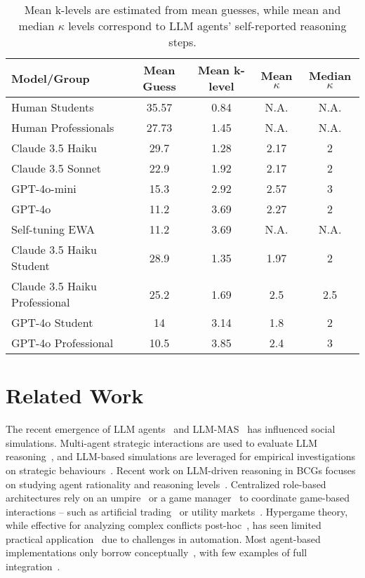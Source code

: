 \documentclass[runningheads]{llncs}
\begin{document}
\begin{table}[htb]
\centering
\begin{tabular}{lcccc}
\toprule
Model/Group & Mean Guess & Mean k-level & Mean $\kappa$ & Median $\kappa$ \\
\midrule
Human Students & 35.57 & 0.84 & N.A. & N.A.\\
Human Professionals & 27.73 & 1.45 & N.A. & N.A. \\
Claude 3.5 Haiku & 29.7 & 1.28 & 2.17 & 2\\
Claude 3.5 Sonnet & 22.9 & 1.92 & 2.17 & 2\\
GPT-4o-mini & 15.3 & 2.92 & 2.57 & 3\\
GPT-4o & 11.2 & 3.69 & 2.27 & 2\\
Self-tuning EWA & 11.2 & 3.69 & N.A. & N.A.\\
\midrule
Claude 3.5 Haiku Student& 28.9 & 1.35 & 1.97 & 2\\
Claude 3.5 Haiku Professional& 25.2 & 1.69 & 2.5 & 2.5\\
GPT-4o Student & 14 & 3.14 & 1.8 & 2\\
GPT-4o Professional& 10.5 & 3.85 & 2.4 & 3\\
\bottomrule
\end{tabular}
\caption{Mean k-levels are estimated from mean guesses, while mean and median $\kappa$ levels correspond to LLM agents' self-reported reasoning steps.}
\label{tab:klevels}
\end{table}


\section{Related Work}

The recent emergence of LLM agents~\cite{wang2024survey} and LLM-MAS~\cite{li2024survey} has influenced social simulations. Multi-agent strategic interactions are used to evaluate LLM reasoning~\cite{mensfelt2024logicenhancedlanguagemodelagents,duan2024gtbench}, and LLM-based simulations are leveraged for empirical investigations on strategic behaviours~\cite{mao2024alympicsllmagentsmeet,mensfelt2024autoformalizing}. Recent work on LLM-driven reasoning in BCGs focuses on studying agent rationality and reasoning levels~\cite{zhang2024klevelreasoningestablishinghigher,lu2024strategicinteractionslargelanguage,guo2024economicsarenalargelanguage}. Centralized role-based architectures rely on an umpire~\cite{STATHIS1998401} or a game manager~\cite{gamemaster-gameplayerMAS2007} to coordinate game-based interactions -- such as artificial trading~\cite{tradingagentcompetition} or utility markets~\cite{master-slave-energymanagement,masterslavegames2024}.
Hypergame theory, while effective for analyzing complex conflicts post-hoc~\cite{Bennett1980}, has seen limited practical application~\cite{BENNETT1981shippingcrisis} due to challenges in automation. Most agent-based implementations only borrow conceptually~\cite{dharmadhikari2021hypergamepathplanning,Aitchison2021deceptionhypergames}, with few examples of full integration~\cite{Kahn2021thesis,TANG2024networkattackdefense}.
\end{document}
